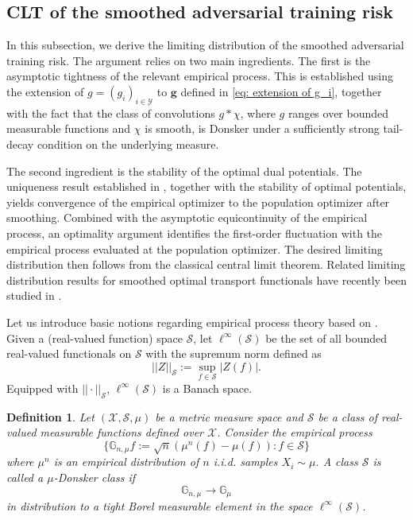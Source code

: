 \documentclass{amsart}
\theoremstyle{plain}
\numberwithin{equation}{section}\newtheorem{theorem}{Theorem}[section]
\newtheorem{definition}[theorem]{Definition}
\theoremstyle{remark}
\begin{document}
\subsection{CLT of the smoothed adversarial training risk}


 
In this subsection, we derive the limiting distribution of the smoothed adversarial training risk. The argument relies on two main ingredients. The first is the asymptotic tightness of the relevant empirical process. This is established using the extension of $g=(g_i)_{i \in \mathcal{Y}}$ to $\bm{g}$ defined in \eqref{eq: extension of g_i}, together with the fact that the class of convolutions $g * \chi$, where $g$ ranges over bounded measurable functions and $\chi$ is smooth, is Donsker under a sufficiently strong tail-decay condition on the underlying measure.

The second ingredient is the stability of the optimal dual potentials. The uniqueness result established in , together with the stability of optimal potentials, yields convergence of the empirical optimizer to the population optimizer after smoothing.
Combined with the asymptotic equicontinuity of the empirical process, an optimality argument identifies the first-order fluctuation with the empirical process evaluated at the population optimizer. The desired limiting distribution then follows from the classical central limit theorem. Related limiting distribution results for smoothed optimal transport
functionals have recently been studied in
\cite{limit_pWasserstein2024, Goldfeld_Kato_Rioux_Sadhu2024}.





Let us introduce basic notions regarding empirical process theory based on \cite{MR4628026, Sen_introEmpirical2022}. Given a (real-valued function) space $\mathcal{S}$, let $\ell^{\infty}(\mathcal{S})$ be the set of all bounded real-valued functionals on $\mathcal{S}$ with the supremum norm defined as
\[
    || Z ||_\mathcal{S} := \sup_{f \in \mathcal{S}} |Z(f)|.
\]
Equipped with $|| \cdot ||_\mathcal{S}$, $\ell^{\infty}(\mathcal{S})$ is a Banach space. 




\begin{definition}
Let $(\mathcal{X}, \mathcal{S}, \mu)$ be a metric measure space and $\mathcal{S}$ be a class of real-valued measurable functions defined over $\mathcal{X}$. Consider the empirical process 
\[
    \{\mathbb{G}_{n,\mu}f:= \sqrt{n}(\mu^n(f) - \mu (f)): f \in \mathcal{S}\}
\]
where $\mu^n$ is an empirical distribution of $n$ i.i.d. samples $X_i \sim \mu$. A class $\mathcal{S}$ is called a $\mu$-Donsker class if
\begin{equation}
    \mathbb{G}_{n,\mu} \longrightarrow \mathbb{G}_\mu
\end{equation}
in distribution to a tight Borel measurable element in the space $\ell^{\infty}(\mathcal{S})$. 
\end{definition}
\end{document}
